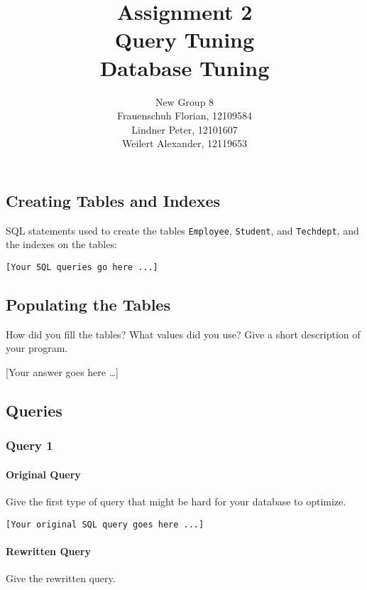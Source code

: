 \documentclass[11pt]{scrartcl}
\title{
    \textbf{\large Assignment 2} \\
    Query Tuning \\
    {\large Database Tuning}
}
\author{
    New Group 8 \\
    \large Frauenschuh Florian, 12109584 \\
    \large Lindner Peter, 12101607 \\
    \large Weilert Alexander, 12119653
}
\newcommand{\youranswerhere}{[Your answer goes here \ldots]}
\begin{document}
    \maketitle\thispagestyle{empty}

    \subsection*{Creating Tables and Indexes}

    SQL statements used to create the tables \texttt{Employee}, \texttt{Student}, and \texttt{Techdept}, and the indexes on the tables:

    \begin{lstlisting}[style=dbtsql]
[Your SQL queries go here ...]
    \end{lstlisting}

    \subsection*{Populating the Tables}

    How did you fill the tables? What values did you use? Give a short description of your program.

    \youranswerhere{}

    \subsection*{Queries}

    \subsubsection*{Query 1}

    \paragraph{Original Query}

    Give the first type of query that might be hard for your database to optimize.

    \begin{lstlisting}[style=dbtsql]
[Your original SQL query goes here ...]
    \end{lstlisting}

    \paragraph{Rewritten Query}

    Give the rewritten query.
\end{document}
